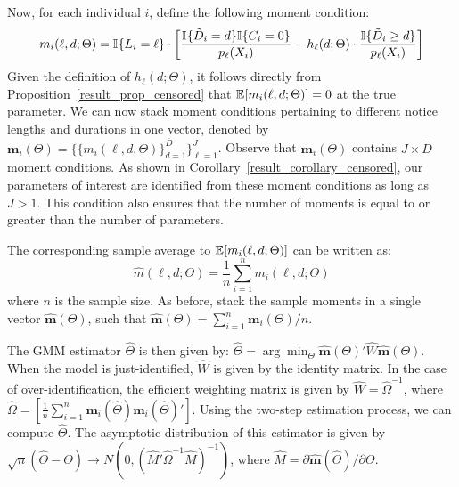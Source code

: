 \documentclass{div}
\begin{document}
Now, for each individual $i$, define the following moment condition:
\[ m_i(\ell,d;\Theta) = \I\{L_i=\ell\} \cdot \left[\frac{\I\{\tilde{D}_i=d\}\I\{C_i=0\}}{p_{\ell}(X_i)}-h_\ell(d;\Theta) \cdot \frac{\I\{\tilde{D}_i \geq d\}}{p_{\ell}(X_i)} \right]  \]
Given the definition of \(h_\ell(d;\Theta)\), it follows directly from Proposition~\ref{result_prop_censored} that \(\E[m_i(\ell,d;\Theta)] = 0\) at the true parameter. We can now stack moment conditions pertaining to different notice lengths and durations in one vector, denoted by $ \mathbf{m}_i(\Theta) = \{ \{ m_i(\ell,d,\Theta) \}_{d=1}^{\bar{D}}\}_{\ell=1}^{J} $. Observe that $\mathbf{m}_i(\Theta)$ contains $J \times \bar{D}$ moment conditions. As shown in Corollary~\ref{result_corollary_censored}, our parameters of interest are identified from these moment conditions as long as $J>1$. This condition also ensures that the number of moments is equal to or greater than the number of parameters.

The corresponding sample average to \(\E[m_i(\ell,d;\Theta)]\) can be written as:
\[
  \hat{m}(\ell,d;\Theta) = \frac{1}{n}\sum_{i=1}^n m_i(\ell,d;\Theta) \]
where \(n\) is the sample size. As before, stack the sample moments in a single vector \( \hat{\mathbf{m}}(\Theta)\), such that \( \hat{\mathbf{m}}(\Theta) = \sum_{i=1}^n \mathbf{m}_i(\Theta)/n \).

The GMM estimator $\hat{\Theta}$ is then given by:
$ \hat{\Theta} = \arg \min_{\Theta}  \hat{\mathbf{m}}(\Theta)' \hat{W}  \hat{\mathbf{m}}(\Theta) $. When the model is just-identified, $\hat{W}$ is given by the identity matrix. In the case of over-identification, the efficient weighting matrix is given by $\hat{W} =\hat{\Omega}^{-1}$, where $\hat{\Omega}= \left[\frac{1}{n} \sum_{i=1}^n \mathbf{m}_i(\hat{\Theta}) \mathbf{m}_i(\hat{\Theta})' \right]$. Using the two-step estimation process, we can compute $\hat{\Theta}$. The asymptotic distribution of this estimator is given by $ \sqrt{n}(\hat{\Theta}-\Theta) \rightarrow N(0,(\hat{M}' \hat{\Omega}^{-1} \hat{M})^{-1})$, where $\hat{M} = \partial \hat{\mathbf{m}}(\hat{\Theta})/\partial \Theta$. %
\end{document}
